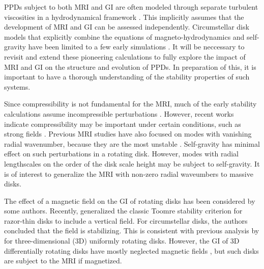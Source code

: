 \documentclass[iop]{emulateapj}
\begin{document}
PPDs subject to both MRI and GI are often modeled through separate
turbulent viscosities in a hydrodynamical framework 
\citep{terquem08}. This implicitly assumes that the development of MRI 
and GI can be assessed independently. 
Circumstellar disk models that explicitly combine the equations of magneto-hydrodynamics
and self-gravity have been limited to a few early simulations 
\citep{fromang04,fromang04b,fromang05}. It will be neccessary to %
revisit and extend these pioneering calculations to fully explore the
impact of MRI and GI on the structure and evolution of PPDs. In
preparation of this, it is important to have a thorough understanding
of the stability properties of such systems.  


Since compressibility is not fundamental for the MRI, much of the
early stability calculations assume incompressible perturbations
\citep{goodman94,jin96}. However, recent works indicate
compressibility may be important under certain conditions,
such as strong fields \citep{kim00, pessah05,bonanno07}.   
Previous MRI studies have also focused on modes with vanishing
radial wavenumber, because they are the most unstable
\citep{sano99,reyes01}. Self-gravity has minimal effect on such
perturbations in a rotating disk. However, modes
with radial lengthscales on the order of the disk scale height may be
subject to self-gravity. It is of interest to generalize the MRI with
non-zero radial waveumbers to massive disks. 




The effect of a magnetic field on the GI of rotating disks has been
considered by some authors.  
Recently, \cite{lizano10} generalized the classic Toomre stability
criterion for razor-thin disks to include a vertical field. For
circumstellar disks, the authors concluded that the field is
stabilizing. This is consistent with previous analysis by
\cite{nakamura83} for three-dimensional (3D) uniformly rotating
disks. However, the GI of 3D differentially rotating disks have
mostly neglected magnetic fields \citep{mamat10,kim12}, but such disks
are subject to the MRI if magnetized. 
%
\end{document}
